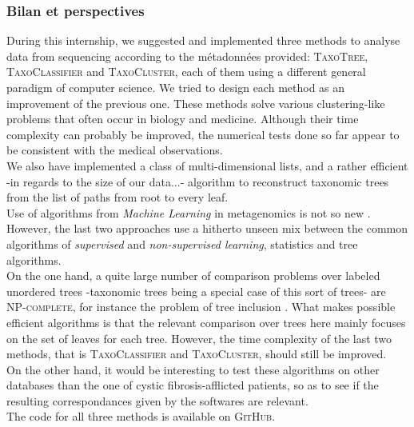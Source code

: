 \documentclass{beamer}
\begin{document}
\begin{frame}
\frametitle{Bilan et perspectives}

During this internship, we suggested and implemented three methods to analyse data from sequencing according to the métadonnées provided: \textsc{TaxoTree}, \textsc{TaxoClassifier} and \textsc{TaxoCluster}, each of them using a different general paradigm of computer science. We tried to design each method as an improvement of the previous one. These methods solve various clustering-like problems that often occur in biology and medicine. Although their time complexity can probably be improved, the numerical tests done so far appear to be consistent with the medical observations.\\

We also have implemented a class of multi-dimensional lists, and a rather efficient -in regards to the size of our data...- algorithm to reconstruct taxonomic trees from the list of paths from root to every leaf.\\

Use of algorithms from \emph{Machine Learning} in metagenomics is not so new \cite{Nikolski}. However, the last two approaches use a hitherto unseen mix between the common algorithms of \emph{supervised} and \emph{non-supervised learning}, statistics and tree algorithms.\\

On the one hand, a quite large number of comparison problems over labeled unordered trees -taxonomic trees being a special case of this sort of trees- are \textsc{NP-complete}, for instance the problem of tree inclusion \cite{TreeInclusion}. What makes possible efficient algorithms is that the relevant comparison over trees here mainly focuses on the set of leaves for each tree. However, the time complexity of the last two methods, that is \textsc{TaxoClassifier} and \textsc{TaxoCluster}, should still be improved.\\

On the other hand, it would be interesting to test these algorithms on other databases than the one of cystic fibrosis-afflicted patients, so as to see if the resulting correspondances given by the softwares are relevant.\\

The code for all three methods is available on \textsc{GitHub}.\\

\end{frame}
\end{document}
